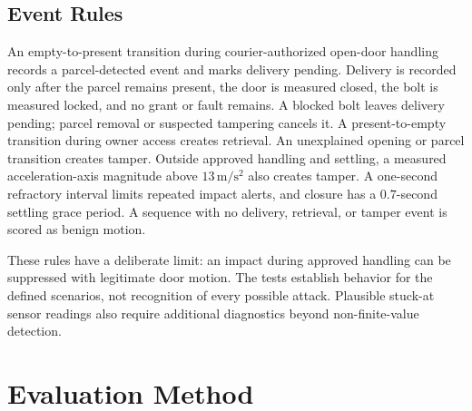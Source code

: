 \documentclass[conference,letterpaper]{IEEEtran}
\begin{document}
\subsection{Event Rules}
An empty-to-present transition during courier-authorized open-door handling records a parcel-detected event and marks delivery pending. Delivery is recorded only after the parcel remains present, the door is measured closed, the bolt is measured locked, and no grant or fault remains. A blocked bolt leaves delivery pending; parcel removal or suspected tampering cancels it. A present-to-empty transition during owner access creates retrieval. An unexplained opening or parcel transition creates tamper. Outside approved handling and settling, a measured acceleration-axis magnitude above $13\,\mathrm{m/s^2}$ also creates tamper. A one-second refractory interval limits repeated impact alerts, and closure has a $0.7$-second settling grace period. A sequence with no delivery, retrieval, or tamper event is scored as benign motion.

These rules have a deliberate limit: an impact during approved handling can be suppressed with legitimate door motion. The tests establish behavior for the defined scenarios, not recognition of every possible attack. Plausible stuck-at sensor readings also require additional diagnostics beyond non-finite-value detection.

\section{Evaluation Method}
\label{sec:method}
\end{document}
